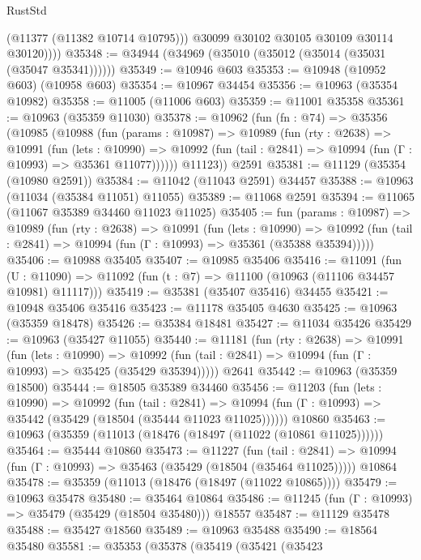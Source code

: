 \begin{lexlean}{RustStd}
\begin{coremodule}
              (@11377 (@11382 @10714 @10795)))
            @30099
            @30102
            @30105
            @30109
            @30114
            @30120))))
@35348 := @34944 (@34969 (@35010 (@35012 (@35014 (@35031 (@35047 @35341))))))
@35349 := @10946 @603
@35353 := @10948 (@10952 @603) (@10958 @603)
@35354 := @10967 @34454
@35356 := @10963 (@35354 @10982)
@35358 := @11005 (@11006 @603)
@35359 := @11001 @35358
@35361 := @10963 (@35359 @11030)
@35378 := @10962
    (fun (fn : @74) =>
    @35356
      (@10985
        (@10988
          (fun (params : @10987) =>
          @10989
            (fun (rty : @2638) =>
            @10991
              (fun (lets : @10990) =>
              @10992 (fun (tail : @2841) => @10994 (fun (Γ : @10993) => @35361 @11077))))))
        @11123))
    @2591
@35381 := @11129 (@35354 (@10980 @2591))
@35384 := @11042 (@11043 @2591) @34457
@35388 := @10963 (@11034 (@35384 @11051) @11055)
@35389 := @11068 @2591
@35394 := @11065 (@11067 @35389 @34460 @11023 @11025)
@35405 := fun (params : @10987) =>
  @10989
    (fun (rty : @2638) =>
    @10991
      (fun (lets : @10990) =>
      @10992 (fun (tail : @2841) => @10994 (fun (Γ : @10993) => @35361 (@35388 @35394)))))
@35406 := @10988 @35405
@35407 := @10985 @35406
@35416 := @11091
    (fun (U : @11090) => @11092 (fun (t : @7) => @11100 (@10963 (@11106 @34457 @10981) @11117)))
@35419 := @35381 (@35407 @35416) @34455
@35421 := @10948 @35406 @35416
@35423 := @11178 @35405 @4630
@35425 := @10963 (@35359 @18478)
@35426 := @35384 @18481
@35427 := @11034 @35426
@35429 := @10963 (@35427 @11055)
@35440 := @11181
    (fun (rty : @2638) =>
    @10991
      (fun (lets : @10990) =>
      @10992 (fun (tail : @2841) => @10994 (fun (Γ : @10993) => @35425 (@35429 @35394)))))
    @2641
@35442 := @10963 (@35359 @18500)
@35444 := @18505 @35389 @34460
@35456 := @11203
    (fun (lets : @10990) =>
    @10992
      (fun (tail : @2841) =>
      @10994 (fun (Γ : @10993) => @35442 (@35429 (@18504 (@35444 @11023 @11025))))))
    @10860
@35463 := @10963 (@35359 (@11013 (@18476 (@18497 (@11022 (@10861 @11025))))))
@35464 := @35444 @10860
@35473 := @11227
    (fun (tail : @2841) => @10994 (fun (Γ : @10993) => @35463 (@35429 (@18504 (@35464 @11025)))))
    @10864
@35478 := @35359 (@11013 (@18476 (@18497 (@11022 @10865))))
@35479 := @10963 @35478
@35480 := @35464 @10864
@35486 := @11245 (fun (Γ : @10993) => @35479 (@35429 (@18504 @35480))) @18557
@35487 := @11129 @35478
@35488 := @35427 @18560
@35489 := @10963 @35488
@35490 := @18564 @35480
@35581 := @35353
    (@35378
      (@35419
        (@35421
          (@35423

\end{coremodule}
\end{lexlean}
